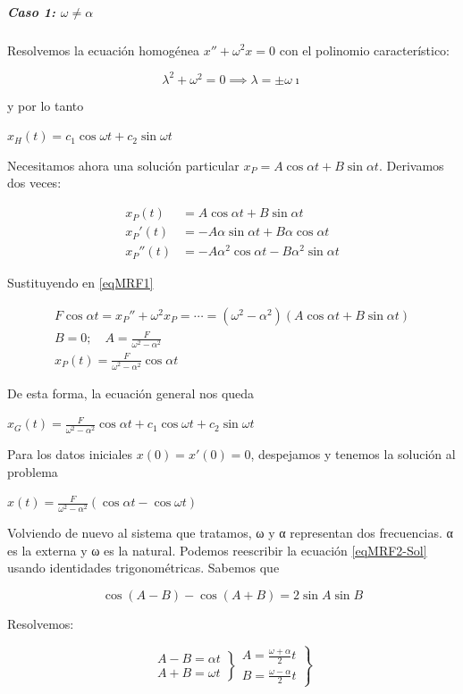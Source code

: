 \subparagraph{Caso 1: $ω≠α$}

Resolvemos la ecuación homogénea $x''+ω^2 x = 0$ con el polinomio característico:

\[ λ^2+ω^2  = 0 \implies λ = \pm ω\imath \]

y por lo tanto

\( x_H(t) = c_1 \cos ωt + c_2 \sin ωt \)

Necesitamos ahora una solución particular $x_P = A\cos αt + B\sin αt$. Derivamos dos veces:

\begin{align*}
x_P(t) &= A\cos αt + B\sin αt \\
x_P'(t) &= -Aα\sin αt + Bα\cos αt \\
x_P''(t) &= -Aα^2\cos αt - Bα^2\sin αt 
\end{align*}

Sustituyendo en \eqref{eqMRF1}

\begin{gather*}
 F\cos αt = x_P'' + ω^2x_P = \dotsb = (ω^2-α^2)\left(A\cos αt + B\sin αt\right) \\
 B = 0;\quad A= \frac{F}{ω^2-α^2} \\
 x_P(t) = \frac{F}{ω^2-α^2}\cos αt
\end{gather*}

De esta forma, la ecuación general nos queda

\( x_G(t) = \frac{F}{ω^2-α^2}\cos αt + c_1 \cos ωt + c_2 \sin ωt \)

Para los datos iniciales $x(0) = x'(0) = 0$, despejamos y tenemos la solución al problema

\(\label{eqMRF2-Sol} x(t) = \frac{F}{ω^2-α^2}\left(\cos αt - \cos ωt\right) \)

Volviendo de nuevo al sistema que tratamos, ω y α representan dos frecuencias. α es la externa y ω es la natural. Podemos reescribir la ecuación \eqref{eqMRF2-Sol} usando identidades trigonométricas. Sabemos que

\[ \cos (A-B) - \cos(A+B) = 2\sin A \sin B \]

Resolvemos:

\[ \left.\begin{matrix}A - B = αt \\ A + B = ωt \end{matrix}\right\}
\left.\begin{matrix}A = \frac{ω+α}{2}t \\ B = \frac{ω-α}{2}t\end{matrix}\right\} \]

